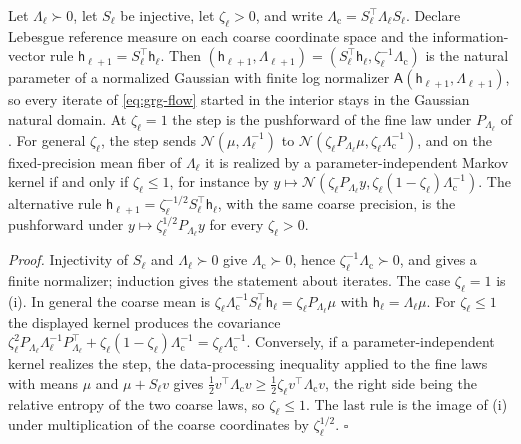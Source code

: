 Let \(\Lambda_\ell\succ0\), let \(S_\ell\) be injective, let \(\zeta_\ell>0\), and write
\(\Lambda_{\mathrm c}=S_\ell^\top\Lambda_\ell S_\ell\). Declare Lebesgue reference measure
on each coarse coordinate space and the information-vector rule
\(\mathsf h_{\ell+1}=S_\ell^\top\mathsf h_\ell\). Then
\((\mathsf h_{\ell+1},\Lambda_{\ell+1})=(S_\ell^\top\mathsf h_\ell,\zeta_\ell^{-1}\Lambda_{\mathrm c})\)
is the natural parameter of a normalized Gaussian with finite log normalizer
\(\mathsf A(\mathsf h_{\ell+1},\Lambda_{\ell+1})\), so every iterate of \eqref{eq:grg-flow}
started in the interior stays in the Gaussian natural domain. At \(\zeta_\ell=1\) the step
is the pushforward of the fine law under \(P_{\Lambda_\ell}\) of
. For general \(\zeta_\ell\), the step sends
\(\mathcal N(\mu,\Lambda_\ell^{-1})\) to
\(\mathcal N(\zeta_\ell P_{\Lambda_\ell}\mu,\zeta_\ell\Lambda_{\mathrm c}^{-1})\), and on the
fixed-precision mean fiber of \(\Lambda_\ell\) it is realized by a parameter-independent
Markov kernel if and only if \(\zeta_\ell\leq1\), for instance by
\(y\mapsto\mathcal N(\zeta_\ell P_{\Lambda_\ell}y,\zeta_\ell(1-\zeta_\ell)\Lambda_{\mathrm c}^{-1})\).
The alternative rule \(\mathsf h_{\ell+1}=\zeta_\ell^{-1/2}S_\ell^\top\mathsf h_\ell\), with the
same coarse precision, is the pushforward under
\(y\mapsto\zeta_\ell^{1/2}P_{\Lambda_\ell}y\) for every \(\zeta_\ell>0\).

\noindent\emph{Proof.}
Injectivity of \(S_\ell\) and \(\Lambda_\ell\succ0\) give \(\Lambda_{\mathrm c}\succ0\), hence
\(\zeta_\ell^{-1}\Lambda_{\mathrm c}\succ0\), and 
gives a finite normalizer; induction gives the statement about iterates. The case
\(\zeta_\ell=1\) is (i). In general the coarse mean is
\(\zeta_\ell\Lambda_{\mathrm c}^{-1}S_\ell^\top\mathsf h_\ell=\zeta_\ell P_{\Lambda_\ell}\mu\) with
\(\mathsf h_\ell=\Lambda_\ell\mu\). For \(\zeta_\ell\leq1\) the displayed kernel produces the
covariance
\(\zeta_\ell^2P_{\Lambda_\ell}\Lambda_\ell^{-1}P_{\Lambda_\ell}^\top
+\zeta_\ell(1-\zeta_\ell)\Lambda_{\mathrm c}^{-1}=\zeta_\ell\Lambda_{\mathrm c}^{-1}\).
Conversely, if a parameter-independent kernel realizes the step, the data-processing
inequality  applied to the fine laws with means \(\mu\) and
\(\mu+S_\ell v\) gives
\(\tfrac12v^\top\Lambda_{\mathrm c}v\geq\tfrac12\zeta_\ell v^\top\Lambda_{\mathrm c}v\), the right
side being the relative entropy of the two coarse laws, so \(\zeta_\ell\leq1\). The last rule
is the image of (i) under multiplication of the
coarse coordinates by \(\zeta_\ell^{1/2}\). \hfill$\square$

